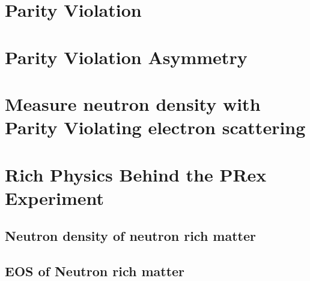\section{Parity Violation}
\section{Parity Violation Asymmetry}
\section{Measure neutron density with Parity Violating electron scattering}
\section{Rich Physics Behind the PRex Experiment}
\subsection{Neutron density of neutron rich matter}
\subsection{EOS of Neutron rich matter}




